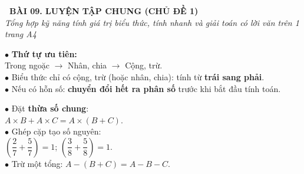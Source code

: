 \documentclass[14pt,a4paper,oneside]{extbook}
\begin{document}
\noindent
\begin{tcolorbox}[
  enhanced,
  colback=teal!8!white,
  colframe=teal!80!black,
  arc=3mm,
  boxrule=1.1pt,
  width=\linewidth,
  halign=center,
  top=2.2mm, bottom=2.2mm,
  left=3mm, right=3mm,
  drop fuzzy shadow
]
  {\large\bfseries\color{teal!95!black}\faBookmark\ BÀI 09. LUYỆN TẬP CHUNG (CHỦ ĐỀ 1)}\\[2pt]
  {\scriptsize\color{black!75}\itshape Tổng hợp kỹ năng tính giá trị biểu thức, tính nhanh và giải toán có lời văn trên 1 trang A4}
\end{tcolorbox}

\vspace{3.2mm}
\noindent
\begin{minipage}[t]{0.54\textwidth}
  \begin{tcolorbox}[
    enhanced,
    title={\footnotesize\bfseries\color{white}\faCalculator\ 1. Quy tắc tính giá trị biểu thức},
    colback=blue!2!white,
    colframe=blue!75!black,
    arc=2.5mm, boxrule=0.8pt, top=1.8mm, bottom=1.8mm, left=2.2mm, right=2.2mm
  ]
    \footnotesize
    $\bullet$ \textbf{Thứ tự ưu tiên:}\\
    \quad Trong ngoặc $\rightarrow$ Nhân, chia $\rightarrow$ Cộng, trừ.\\
    $\bullet$ Biểu thức chỉ có cộng, trừ (hoặc nhân, chia): tính từ \textbf{trái sang phải}.\\
    $\bullet$ Nếu có hỗn số: \textbf{chuyển đổi hết ra phân số} trước khi bắt đầu tính toán.
  \end{tcolorbox}
\end{minipage}%
\hfill
\begin{minipage}[t]{0.44\textwidth}
  \begin{tcolorbox}[
    enhanced,
    title={\footnotesize\bfseries\color{white}\faBolt\ 2. Kỹ thuật tính thuận tiện},
    colback=teal!2!white,
    colframe=teal!75!black,
    arc=2.5mm, boxrule=0.8pt, top=1.8mm, bottom=1.8mm, left=2mm, right=2mm
  ]
    \footnotesize
    $\bullet$ Đặt \textbf{thừa số chung}:\\
    \quad $A \times B + A \times C = A \times (B + C)$.\\
    $\bullet$ Ghép cặp tạo số nguyên:\\
    \quad $\left(\dfrac{2}{7} + \dfrac{5}{7}\right) = 1$; $\left(\dfrac{3}{8} + \dfrac{5}{8}\right) = 1$.\\
    $\bullet$ Trừ một tổng: $A - (B + C) = A - B - C$.
  \end{tcolorbox}
\end{minipage}
\end{document}
